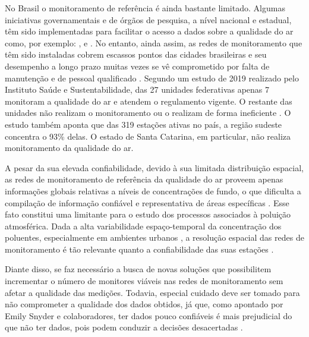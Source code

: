 No Brasil o monitoramento de referência é ainda bastante limitado. Algumas iniciativas governamentais e de órgãos de pesquisa, a nível nacional e estadual, têm sido implementadas para facilitar o acesso a dados sobre a qualidade do ar como, por exemplo: \cite{CETESB2020RedesAr}, \cite{IEMA2020QualidadeAr} e \cite{IEMA/ES2020IEMAAr}. No entanto, ainda assim, as redes de monitoramento que têm sido instaladas cobrem escassos pontos das cidades brasileiras e seu desempenho a longo prazo muitas vezes se vê comprometido por falta de manutenção e de pessoal qualificado \cite{Oyama2017AIRBRAZIL}. Segundo um estudo de 2019 realizado pelo Instituto Saúde e Sustentabilidade, das 27 unidades federativas apenas 7 monitoram a qualidade do ar e atendem o regulamento vigente. O restante das unidades não realizam o monitoramento ou o realizam de forma ineficiente \cite{InstitutoSaudeeSustentabilidade2019AnaliseBrasil}. O estudo também aponta que das 319 estações ativas no país, a região sudeste concentra o 93\% delas. O estado de Santa Catarina, em particular, não realiza monitoramento da qualidade do ar.

A pesar da sua elevada confiabilidade, devido à sua limitada distribuição espacial, as redes de monitoramento de referência da qualidade do ar proveem apenas informações globais relativas a níveis de concentrações de fundo, o que dificulta a compilação de informação confiável e representativa de áreas específicas \cite{Kumar2015}. Esse fato constitui uma limitante para o estudo dos processos associados à poluição atmosférica. Dada a alta variabilidade espaço-temporal da concentração dos poluentes, especialmente em ambientes urbanos \cite{Mead2013TheNetworks}, a resolução espacial das redes de monitoramento é tão relevante quanto a confiabilidade das suas estações \cite{Jiao2016CommunityStates}.

Diante disso, se faz necessário a busca de novas soluções que possibilitem incrementar o número de monitores viáveis nas redes de monitoramento sem afetar a qualidade das medições. Todavia, especial cuidado deve ser tomado para não comprometer a qualidade dos dados obtidos, já que, como apontado por Emily Snyder e colaboradores, ter dados pouco confiáveis é mais prejudicial do que não ter dados, pois podem conduzir a decisões desacertadas \cite{Snyder2013}.

